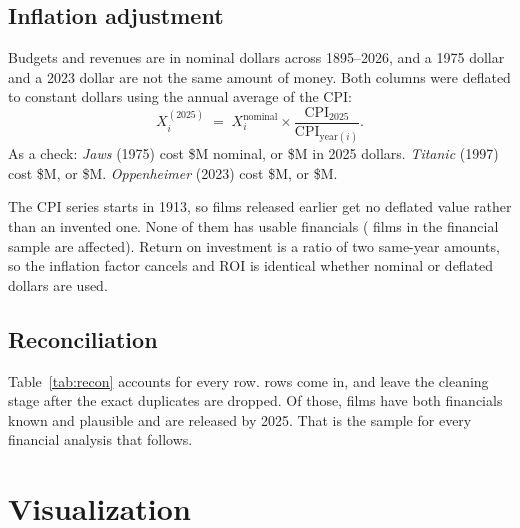 \documentclass[a4paper,12pt]{report}
\newcommand{\tablein}[1]{}
\begin{document}
\section{Inflation adjustment}

Budgets and revenues are in nominal dollars across 1895--2026, and a 1975 dollar and a 2023 dollar are not the same amount of money. Both columns were deflated to constant \CleanCpiBaseYear{} dollars using the annual average of the CPI:
\begin{equation}
  X^{(2025)}_i \;=\; X^{\text{nominal}}_i \times \frac{\text{CPI}_{2025}}{\text{CPI}_{\text{year}(i)}} .
\end{equation}
As a check: \emph{Jaws} (1975) cost \$\CleanDeflateJawsNominalM{}M nominal, or \$\CleanDeflateJawsTwoZeroTwoFiveM{}M in 2025 dollars. \emph{Titanic} (1997) cost \$\CleanDeflateTitanicNominalM{}M, or \$\CleanDeflateTitanicTwoZeroTwoFiveM{}M. \emph{Oppenheimer} (2023) cost \$\CleanDeflateOppenheimerNominalM{}M, or \$\CleanDeflateOppenheimerTwoZeroTwoFiveM{}M.

The CPI series starts in 1913, so films released earlier get no deflated value rather than an invented one. None of them has usable financials (\CleanDeflationLostUsable{} films in the financial sample are affected). Return on investment is a ratio of two same-year amounts, so the inflation factor cancels and ROI is identical whether nominal or deflated dollars are used.

\section{Reconciliation}

Table~\ref{tab:recon} accounts for every row. \CleanRowsIn{} rows come in, and \CleanRowsOut{} leave the cleaning stage after the exact duplicates are dropped. Of those, \CleanUsableFinancialSample{} films have both financials known and plausible and are released by 2025. That is the sample for every financial analysis that follows.

\begin{table}[htbp]
\centering\small
\tablein{tab2_4_reconciliation}
\caption{Row reconciliation. Only exact duplicates are removed; the financial sample is a flagged subset, not a separate file.}
\label{tab:recon}
\end{table}

\chapter{Visualization}\label{ch:viz}
\end{document}
